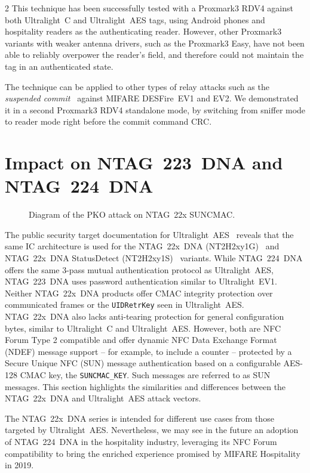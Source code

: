 \documentclass[10pt,letterpaper]{article}
\begin{document}
\begin{multicols}{2}
This technique has been successfully tested with a Proxmark3 RDV4 against both Ultralight~C and Ultralight~AES tags, using Android phones and hospitality readers as the authenticating reader.
However, other Proxmark3 variants with weaker antenna drivers, such as the Proxmark3 Easy, have not been able to reliably overpower the reader's field, and therefore could not maintain the tag in an authenticated state.

The technique can be applied to other types of relay attacks such as the \emph{suspended commit}~\cite{flynn_2919} against MIFARE DESFire~EV1 and EV2. We demonstrated it in a second Proxmark3 RDV4 standalone mode, by switching from sniffer mode to reader mode right before the commit command CRC.

\section{Impact on NTAG~223~DNA and NTAG~224~DNA}
\label{sec:ntag22x}

\begin{figure}[!b]
  \centering
  
  \caption{Diagram of the PKO attack on NTAG~22x SUNCMAC.}
  \label{fig:suncmacpko}
\end{figure}

The public security target documentation for Ultralight~AES~\cite{mf0aes_st_1r1_2022} reveals that the same IC architecture is used for the NTAG~22x~DNA (NT2H2xy1G)~\cite{nt2h2331g0_3r1_2023, nt2h2421g0_3r2_2023} and NTAG~22x~DNA StatusDetect (NT2H2xy1S)~\cite{nt2h2331s0_3r1_2023, nt2h2421s0_3r2_2023} variants.
While NTAG~224~DNA offers the same 3-pass mutual authentication protocol as Ultralight~AES, NTAG~223~DNA uses password authentication similar to Ultralight~EV1.
Neither NTAG~22x~DNA products offer CMAC integrity protection over communicated frames or the \texttt{UIDRetrKey} seen in Ultralight~AES. NTAG~22x~DNA also lacks anti-tearing protection for general configuration bytes, similar to Ultralight~C and Ultralight~AES.
However, both are NFC Forum Type 2 compatible and offer dynamic NFC Data Exchange Format (NDEF) message support -- for example, to include a counter -- protected by a Secure Unique NFC (SUN) message authentication based on a configurable AES-128 CMAC key, the \texttt{SUNCMAC\_KEY}. Such messages are referred to as SUN messages.
This section highlights the similarities and differences between the NTAG~22x~DNA and Ultralight~AES attack vectors.

The NTAG~22x~DNA series is intended for different use cases from those targeted by Ultralight~AES.
Nevertheless, we may see in the future an adoption of NTAG~224~DNA in the hospitality industry, leveraging its NFC Forum compatibility to bring the enriched experience promised by MIFARE Hospitality in 2019.


\end{multicols}
\end{document}
